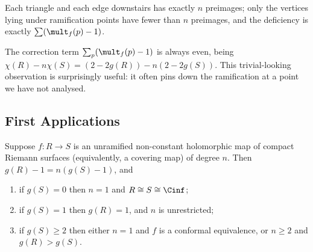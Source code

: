 \begin{center}
\end{center}

Each triangle and each edge downstairs has exactly $n$ preimages; only the vertices lying
under ramification points have fewer than $n$ preimages, and the deficiency is exactly
$\sum(\mult_f(p)-1)$.

\begin{remark}	The correction term $\sum_p (\mult_f(p)-1)$ is always even, being
	$\chi(R) - n\chi(S) = (2-2g(R)) - n(2 - 2g(S))$. This trivial-looking observation is
	surprisingly useful: it often pins down the ramification at a point we have not
	analysed.
\end{remark}

\subsection{First Applications}

\begin{corollary}\label{cor:unramified}
	Suppose $f : R \to S$ is an unramified non-constant holomorphic map of compact Riemann
	surfaces (equivalently, a covering map) of degree $n$. Then $g(R) - 1 = n(g(S)-1)$, and
	\begin{enumerate}[label=(\roman*)]
		\item if $g(S) = 0$ then $n = 1$ and $R \cong S \cong \Cinf$;
		\item if $g(S) = 1$ then $g(R) = 1$, and $n$ is unrestricted;
		\item if $g(S) \geq 2$ then either $n = 1$ and $f$ is a conformal equivalence, or
		$n \geq 2$ and $g(R) > g(S)$.
	\end{enumerate}
\end{corollary}

